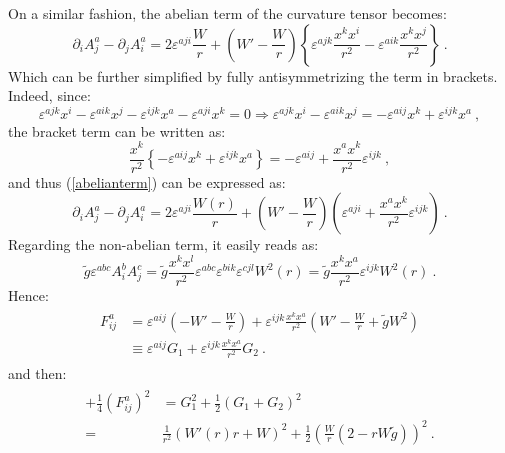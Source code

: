 \documentclass[a4paper,11pt]{article}
\begin{document}
On a similar fashion, the abelian term of the curvature tensor becomes:
\begin{equation}\label{abelianterm}
    \partial_i A_j^a - \partial_j A_i^a = 2 \varepsilon^{aji} \frac{W}{r} + \left( W' - \frac{W}{r} \right) \left\{ \varepsilon^{ajk} \frac{x^k x^i}{r^2} - \varepsilon^{aik} \frac{x^k x^j}{r^2} \right\}\ .
\end{equation}
Which can be further simplified by fully antisymmetrizing the term in brackets. Indeed, since:
\begin{equation}
    \varepsilon^{ajk} x^i - \varepsilon^{aik} x^j - \varepsilon^{ijk} x^a - \varepsilon^{aji} x^k = 0\Rightarrow \varepsilon^{ajk} x^i - \varepsilon^{aik} x^j = - \varepsilon^{aij} x^k + \varepsilon^{ijk} x^a\ ,
\end{equation}
the bracket term can be written as:
\begin{equation}
    \frac{x^k}{r^2} \left\{ - \varepsilon^{aij} x^k + \varepsilon^{ijk} x^a \right\} = - \varepsilon^{aij} + \frac{x^a x^k}{r^2} \varepsilon^{ijk}\ ,
\end{equation}
and thus (\ref{abelianterm}) can be expressed as:
\begin{equation}
     \partial_i A_j^a - \partial_j A_i^a = 2 \varepsilon^{aji} \frac{W(r)}{r} + \left( W' - \frac{W}{r} \right) \left( \varepsilon^{aji} + \frac{x^a x^k}{r^2} \varepsilon^{ijk} \right)\ .
\end{equation}
Regarding the non-abelian term, it easily reads as:
\begin{equation}
    \tilde{g} \varepsilon^{abc} A_i^b A_j^c = \tilde{g} \frac{x^k x^l}{r^2} \varepsilon^{abc} \varepsilon^{bik} \varepsilon^{cjl} W^2(r)= \tilde{g} \frac{x^k x^a}{r^2} \varepsilon^{ijk} W^2(r)\ .
\end{equation}
Hence:
\begin{align}
    \begin{split}
         F_{ij}^a &= \varepsilon^{aij} \left( -W' - \frac{W}{r} \right) + \varepsilon^{ijk} \frac{x^k x^a}{r^2} \left( W' - \frac{W}{r} + \tilde{g} W^2 \right)\\
                & \equiv \varepsilon^{aij} G_1 + \varepsilon^{ijk} \frac{x^k x^a}{r^2} G_2\ .
    \end{split}
\end{align}
and then:
\begin{align}
    \begin{split}
        + \frac{1}{4} (F_{ij}^a)^2 &= G_1^2 + \frac{1}{2} (G_1 + G_2)^2\\
                =& \frac{1}{r^2} (W'(r)r + W)^2 + \frac{1}{2} \left( \frac{W}{r} (2 - r W \tilde{g}) \right)^2\ .
    \end{split}
\end{align}
\end{document}
